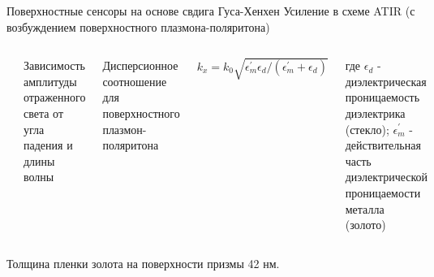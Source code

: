 \documentclass[9pt, compress, xcolor=table]{beamer}
\begin{document}
\begin{frame}{Поверхностные сенсоры на основе свдига Гуса-Хенхен}
Усиление в схеме ATIR (с возбуждением поверхностного плазмона-поляритона)

\begin{columns}[c]
\column{2.8in}
\begin{center}
\includegraphics[scale=0.3]{gh5}
\end{center}
{\small Зависимость амплитуды отраженного света от угла падения и длины волны}

\column{1.8in}


Дисперсионное соотношение для поверхностного плазмон-поляритона

$k_x = k_0 \sqrt{\epsilon_m^{'} \epsilon_d / (\epsilon_m^{'}+ \epsilon_d) }$

где $\epsilon_d$ - диэлектрическая проницаемость диэлектрика (стекло); $\epsilon_m^{'}$ -
действительная часть диэлектрической проницаемости металла (золото)

\end{columns}
Толщина пленки золота на поверхности призмы 42 нм.
\end{frame}
\end{document}
